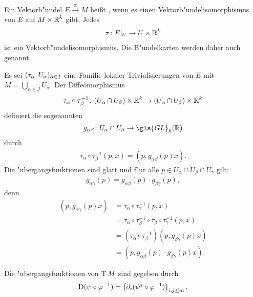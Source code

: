 Ein Vektorb"undel $E \xrightarrow{\pi} M$ heißt , wenn es einen Vektorb"undelisomorphismus von $E$ auf $M \times \operatorname{\mathbb{R}}^k$ gibt. Jedes
\begin{align*}
  \tau \colon E|_U \to U \times \operatorname{\mathbb{R}}^k
\end{align*}
ist ein Vektorb"undelisomorphismus.
Die B"undelkarten werden daher auch  genannt.

Es sei $(\tau_\alpha,U_{\alpha})_{\alpha \in \operatorname{\mathcal{I}}}$ eine Familie lokaler Trivialisierungen von $E$ mit $M = \bigcup_{\alpha \in J}U_{\alpha}$.
Der Diffeomorphismus
\begin{align*}
  \tau_{\alpha} \circ \tau_{\beta}^{-1}\colon (U_{\alpha} \cap U_{\beta}) \times \operatorname{\mathbb{R}}^k \to (U_{\alpha} \cap U_{\beta}) \times \operatorname{\mathbb{R}}^k
\end{align*}
definiert die sogenannten 
\begin{align*}
  g_{\alpha\beta} \colon U_{\alpha} \cap U_{\beta} \to \gls{GL}_k(\R)
\end{align*}
durch 
\begin{align*}
  \tau_{\alpha} \circ \tau_{\beta}^{-1}(p,x) = (p,g_{\alpha\beta}(p) x).
\end{align*}
Die "ubergangsfunktionen sind glatt und f"ur alle $p \in U_{\alpha} \cap U_{\beta} \cap U_{\gamma}$ gilt:
\begin{align*}
  g_{\alpha\gamma}(p) = g_{\alpha\beta}(p) \cdot g_{\beta\gamma}(p),
\end{align*}
denn
\begin{align*}
	(p,g_{\alpha\gamma}(p)x) & = \tau_{\alpha} \circ \tau_{\gamma}^{-1}(p,x)\\
	& = \tau_{\alpha} \circ \tau_{\beta}^{-1} \circ \tau_{\beta} \circ \tau_{\gamma}^{-1}(p,x)\\
	& = (\tau_{\alpha} \circ \tau_{\beta}^{-1})(p,g_{\beta\gamma}(p)x)\\
	& = (p,g_{\alpha\beta}(p)\cdot g_{\beta\gamma}(p)x).
\end{align*}

\begin{bsp}
  Die "ubergangsfunktionen von $\operatorname{T} M$ sind gegeben durch
  \begin{align*}
    \operatorname{D}(\psi \circ \varphi^{-1}) = \left(\partial_i(\psi^j \circ \varphi^{-1})\right)_{i,j \leq m}.
  \end{align*}
\end{bsp}


